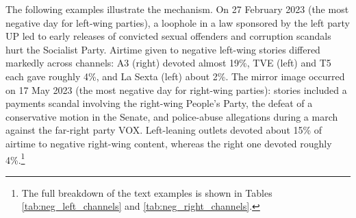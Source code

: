 \documentclass[12pt]{article}
\begin{document}
	
	
	
The following examples illustrate the mechanism. On {27 February 2023} (the most negative day for left-wing parties), a loophole in a law sponsored by the left party UP led to early releases of convicted sexual offenders and corruption scandals hurt the Socialist Party. Airtime given to negative left-wing stories differed markedly across channels: A3 (right) devoted almost 19\%, TVE (left) and T5 each gave roughly 4\%, and La Sexta (left) about 2\%. The mirror image occurred on {17 May 2023} (the most negative day for right-wing parties): stories included a payments scandal involving the right-wing People’s Party, the defeat of a conservative motion in the Senate, and police-abuse allegations during a march against the far-right party VOX. Left-leaning outlets devoted about 15\% of airtime to negative right-wing content, whereas the right one devoted roughly 4\%.\footnote{The full breakdown of the text examples is shown in Tables \ref{tab:neg_left_channels} and \ref{tab:neg_right_channels}.} 

	
	
\end{document}
